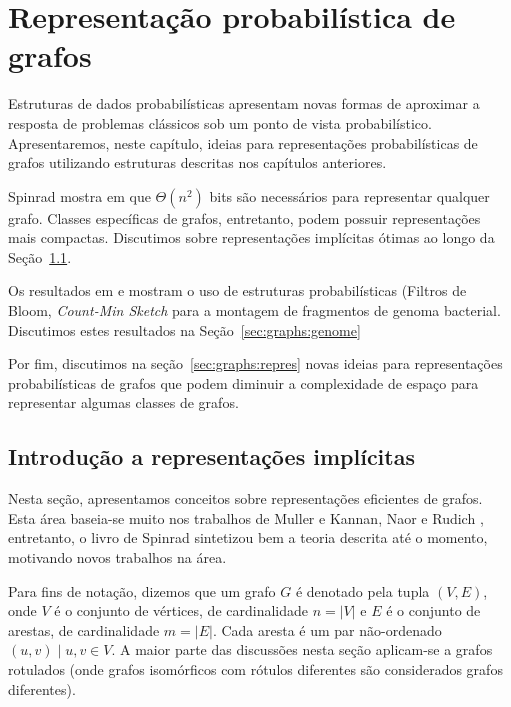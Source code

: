 \chapter{Representação probabilística de grafos}\label{cap:graphs}

Estruturas de dados probabilísticas apresentam novas formas de aproximar a resposta de problemas clássicos sob um ponto de vista probabilístico. Apresentaremos, neste capítulo, ideias para representações probabilísticas de grafos utilizando estruturas descritas nos capítulos anteriores.

Spinrad mostra em \cite{spinrad2003efficient} que $\Theta(n^2)$ bits são necessários para representar qualquer grafo. Classes específicas de grafos, entretanto, podem possuir representações mais compactas. Discutimos sobre representações implícitas ótimas ao longo da Seção~\ref{sec:graphs:implicit}.

Os resultados em \cite{pell2012scaling} e \cite{zhang2014these} mostram o uso de estruturas probabilísticas (Filtros de Bloom, \emph{Count-Min Sketch} para a montagem de fragmentos de genoma bacterial. Discutimos estes resultados na Seção~\ref{sec:graphs:genome}

Por fim, discutimos na seção~\ref{sec:graphs:repres} novas ideias para representações probabilísticas de grafos que podem diminuir a complexidade de espaço para representar algumas classes de grafos.

\section{Introdução a representações implícitas}\label{sec:graphs:implicit}

Nesta seção, apresentamos conceitos sobre representações eficientes de grafos. Esta área baseia-se muito nos trabalhos de Muller \cite{muller1988local} e Kannan, Naor e Rudich \cite{kannan1992implicat}, entretanto, o livro de Spinrad \cite{spinrad2003efficient} sintetizou bem a teoria descrita até o momento, motivando novos trabalhos na área.

Para fins de notação, dizemos que um grafo $G$ é denotado pela tupla $(V, E)$, onde $V$ é o conjunto de vértices, de cardinalidade $n = |V|$ e $E$ é o conjunto de arestas, de cardinalidade $m = |E|$. Cada aresta é um par não-ordenado $(u, v) \mid u,v \in V$. A maior parte das discussões nesta seção aplicam-se a grafos rotulados (onde grafos isomórficos com rótulos diferentes são considerados grafos diferentes).

